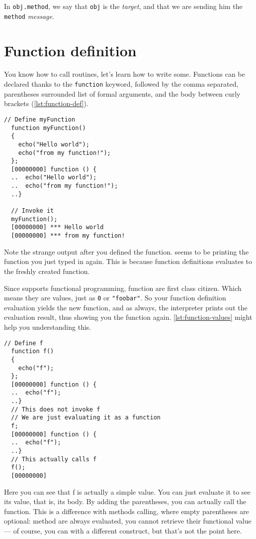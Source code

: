 \documentclass[openright,twoside,12pt]{report}
\newcommand{\lst}[1]{\autoref{lst:#1}}
\begin{document}
In \lstinline|obj.method|, we say that \texttt{obj} is the {\em
  target}, and that we are sending him the \texttt{method} {\em
  message}.

\section{Function definition}

You know how to call routines, let's learn how to write
some. Functions can be declared thanks to the \texttt{function}
keyword, followed by the comma separated, parentheses surrounded list
of formal arguments, and the body between curly brackets (\lst{function-def}).

\begin{lstlisting}[caption=Defining a function,label=lst:function-def]
  // Define myFunction
  function myFunction()
  {
    echo("Hello world");
    echo("from my function!");
  };
  [00000000] function () {
  ..  echo("Hello world");
  ..  echo("from my function!");
  ..}

  // Invoke it
  myFunction();
  [00000000] *** Hello world
  [00000000] *** from my function!
\end{lstlisting}

Note the strange output after you defined the function. \urbi seems to
be printing the function you just typed in again. This is because
function definitions evaluates to the freshly created function.

Since \urbi supports functional programming, function are first class
citizen. Which means they are values, just as \texttt{0} or
\texttt{"foobar"}. So your function definition evaluation yields the
new function, and as always, the interpreter prints out the evaluation
result, thus showing you the function again. \lst{function-values}
might help you understanding this.


\begin{lstlisting}[caption=Function as values,label=lst:function-values]
  // Define f
  function f()
  {
    echo("f");
  };
  [00000000] function () {
  ..  echo("f");
  ..}
  // This does not invoke f
  // We are just evaluating it as a function
  f;
  [00000000] function () {
  ..  echo("f");
  ..}
  // This actually calls f
  f();
  [00000000]
\end{lstlisting}

Here you can see that f is actually a simple value. You can just
evaluate it to see its value, that is, its body. By adding the
parentheses, you can actually call the function. This is a difference
with methods calling, where empty parentheses are optional: method are
always evaluated, you cannot retrieve their functional value --- of
course, you can with a different construct, but that's not the point
here.
\end{document}
